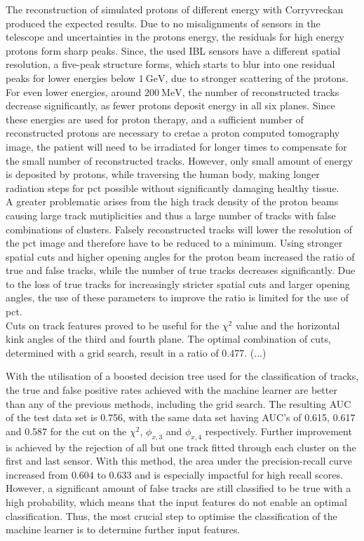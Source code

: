 The reconstruction of simulated protons of different energy with Corryvreckan produced the expected results. Due to no misalignments of sensors in the telescope and uncertainties
in the protons energy, the residuals for high energy protons form sharp peaks. Since, the used IBL sensors have a different spatial resolution, a five-peak structure
forms, which starts to blur into one residual peaks for lower energies below $\SI{1}{\giga\eV}$, due to stronger scattering of the protons. For even lower energies,
around $\SI{200}{\mega\eV}$, the number of reconstructed tracks decrease significantly, as fewer protons deposit energy in all six planes. Since these energies are
used for proton therapy, and a sufficient number of reconstructed protons are necessary to cretae a proton computed tomography image, the patient
will need to be irradiated for longer times to compensate for the small number of reconstructed tracks. However, only small amount of energy is deposited by protons, while traversing
the human body, making longer radiation steps for pct possible without significantly damaging healthy tissue. \\
A greater problematic arises from the high track density of the proton beams causing large track mutiplicities and thus a large number of tracks with false combinations of
clusters. Falsely reconstructed tracks will lower the resolution of the pct image and therefore have to be reduced to a minimum. Using stronger spatial cuts and higher
opening angles for the proton beam increased the ratio of true and false tracks, while the number of true tracks decreases significantly. Due to the loss of
true tracks for increasingly stricter spatial cuts and larger opening angles, the use of these parameters to improve the ratio is limited for the use of pct. \\
Cuts on track features proved to be useful for the $\chi^2$ value and the horizontal kink angles of the third and fourth plane. The optimal combination of cuts, determined
with a grid search, result in a ratio of 0.477. (...)

With the utilisation of a boosted decision tree used for the classification of tracks, the true and false positive rates achieved with the machine learner are better
than any of the previous methods, including the grid search. The resulting AUC of the test data set is 0.756, with the same data set having AUC's of
0.615, 0.617 and 0.587 for the cut on the $\chi^2$, $\phi_{x,3}$ and $\phi_{x,4}$ respectively. Further improvement is achieved by the rejection of all but one track
fitted through each cluster on the first and last sensor. With this method, the area under the precision-recall curve increased from $0.604$ to $0.633$ and is especially
impactful for high recall scores. \\
However, a significant amount of false tracks are still classified to be true
with a high probability, which means that the input features do not enable an optimal classification. Thus, the most crucial step to optimise the classification of the machine learner is
to determine further input features. \\

